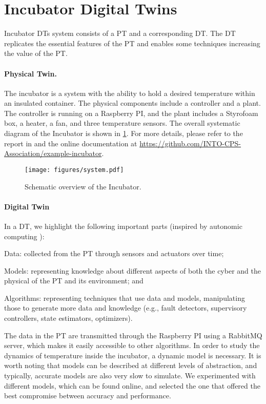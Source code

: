 \section{Incubator Digital Twins} \label{sec:incubator_system}

Incubator DTs system consists of a PT and a corresponding DT. 
The DT replicates the essential features of the PT and enables some techniques increasing the value of the PT.

\paragraph{Physical Twin.}
The incubator is a system with the ability to hold a desired temperature within an insulated container.
The physical components include a controller and a plant. The controller is running on a Raspberry PI, and the plant includes a Styrofoam box, a heater, a fan, and three temperature sensors.
The overall systematic diagram of the Incubator is shown in \cref{fig:incubator}.
For more details, please refer to the report in \cite{feng2021} and the online documentation at \url{https://github.com/INTO-CPS-Association/example-incubator}.

\begin{figure}[h!]
	\centering
	\texttt{[image: figures/system.pdf]}
	\caption{Schematic overview of the Incubator.}
	\label{fig:incubator}
\end{figure}

\paragraph{Digital Twin}
In a DT, we highlight the following important parts \cite{Wright2020} (inspired by autonomic computing \cite{Kephart2003}): 
\begin{inparadesc} 
	\item[Data:] collected from the PT through sensors and actuators over time;
	\item[Models:] representing knowledge about different aspects of both the cyber and the physical of the PT and its environment; and
	\item[Algorithms:] representing techniques that use data and models, manipulating those to generate more data and knowledge (e.g., fault detectors, supervisory controllers, state estimators, optimizers).
\end{inparadesc} 

The data in the PT are transmitted through the Raspberry PI using a RabbitMQ server, which makes it easily accessible to other algorithms. 
In order to study the dynamics of temperature inside the incubator, a dynamic model is necessary. It is worth noting that models can be described at different levels of abstraction, and typically, accurate models are also very slow to simulate.
We experimented with different models, which can be found online, and selected the one that offered the best compromise between accuracy and performance.


